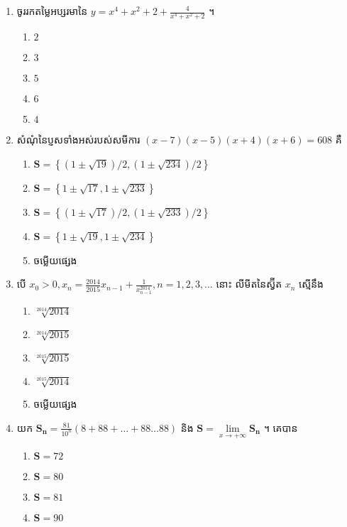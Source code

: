\documentclass[12pt, a4paper]{article}
\begin{document}
\begin{enumerate}[m]
	\item ចូររកតម្លៃអប្សរមានៃ $y=x^4+x^2+2+\frac{4}{x^4+x^2+2}$ ។
	\begin{enumerate}[k,5]
		\item $2$
		\item $3$
		\item $5$
		\item $6$
		\item $4$
	\end{enumerate}
	{\color{blue}\hrulefill}
	\item សំណុំនៃប្ញសទាំងអស់របស់សមីការ $\left(x-7\right)\left(x-5\right)\left(x+4\right)\left(x+6\right)=608$ គឺ
	\begin{enumerate}[k,2]
		\item $\mathbf{S}=\left\lbrace\left(1\pm\sqrt{19}\right)/2,\left(1\pm\sqrt{234}\right)/2\right\rbrace$
		\item $\mathbf{S}=\left\lbrace1\pm\sqrt{17},1\pm\sqrt{233}\right\rbrace$
		\item $\mathbf{S}=\left\lbrace\left(1\pm\sqrt{17}\right)/2,\left(1\pm\sqrt{233}\right)/2\right\rbrace$
		\item $\mathbf{S}=\left\lbrace1\pm\sqrt{19},1\pm\sqrt{234}\right\rbrace$
		\item ចម្លើយផ្សេង
	\end{enumerate}
	{\color{blue}\hrulefill}
	\item បើ $x_0>0,x_n=\frac{2014}{2015}x_{n-1}+\frac{1}{x^{2014}_{n-1}}, n=1,2,3,\dots$ នោះ លីមីតនៃស្វ៊ីត $x_n$ ស្មើនឹង\\
			\begin{enumerate}[k,5]
				\item $\sqrt[2014]{2014}$
				\item $\sqrt[2014]{2015}$
				\item $\sqrt[2015]{2015}$
				\item $\sqrt[2015]{2014}$
				\item ចម្លើយផ្សេង
			\end{enumerate}
	{\color{blue}\hrulefill}
	\item យក $\mathbf{S_n}=\frac{81}{10^n}\left(8+88+\dots+ 88\dots88\right)$ និង $\mathbf{S}=\lim\limits_{x\to+\infty}\mathbf{S_n}$ ។ គេបាន
	\begin{enumerate}[k,5]
		\item $\mathbf{S}=72$
		\item $\mathbf{S}=80$
		\item $\mathbf{S}=81$
		\item $\mathbf{S}=90$

\end{enumerate}
\end{enumerate}
\end{document}
